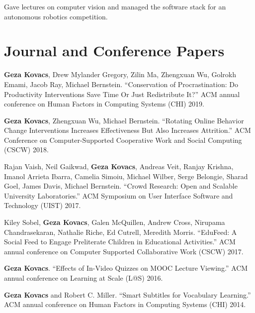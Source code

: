 \documentclass[margin,line]{resume}
\begin{document}
\begin{resume}
\vspace{-8mm}

Gave lectures on computer vision and managed the software stack for an autonomous robotics competition.

\section{\mysidestyle Journal and Conference Papers}


\textbf{Geza Kovacs}, Drew Mylander Gregory, Zilin Ma, Zhengxuan Wu, Golrokh Emami, Jacob Ray, Michael Bernstein. ``Conservation of Procrastination: Do Productivity Interventions Save Time Or Just Redistribute It?'' ACM annual conference on Human Factors in Computing Systems (CHI) 2019. %

\textbf{Geza Kovacs}, Zhengxuan Wu, Michael Bernstein. ``Rotating Online Behavior Change Interventions Increases Effectiveness But Also Increases Attrition.'' ACM Conference on Computer-Supported Cooperative Work and Social Computing (CSCW) 2018. %

Rajan Vaish, Neil Gaikwad, \textbf{Geza Kovacs}, Andreas Veit, Ranjay Krishna, Imanol Arrieta Ibarra, Camelia Simoiu, Michael Wilber, Serge Belongie, Sharad Goel, James Davis, Michael Bernstein. ``Crowd Research: Open and Scalable University Laboratories.'' ACM Symposium on User Interface Software and Technology (UIST) 2017. %

Kiley Sobel, \textbf{Geza Kovacs}, Galen McQuillen, Andrew Cross, Nirupama Chandrasekaran, Nathalie Riche, Ed Cutrell, Meredith Morris. ``EduFeed: A Social Feed to Engage Preliterate Children in Educational Activities.'' ACM annual conference on Computer Supported Collaborative Work (CSCW) 2017. %

\textbf{Geza Kovacs}. ``Effects of In-Video Quizzes on MOOC Lecture Viewing.'' ACM annual conference on Learning at Scale (L@S) 2016. %

\textbf{Geza Kovacs} and Robert C. Miller. ``Smart Subtitles for Vocabulary Learning.'' ACM annual conference on Human Factors in Computing Systems (CHI) 2014. %


\end{resume}
\end{document}
